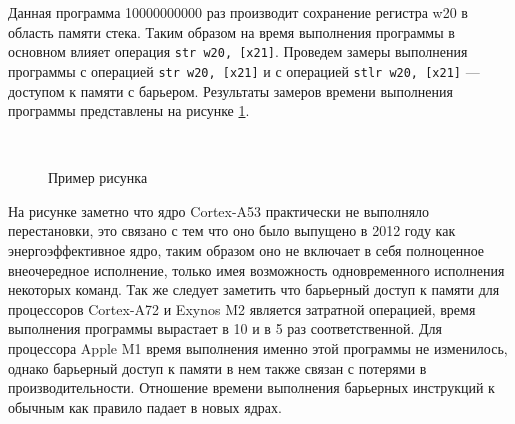 
Данная программа 10000000000 раз производит сохранение регистра w20 в область памяти стека. Таким образом на время выполнения программы в основном влияет операция \texttt{str     w20, [x21]}. Проведем замеры выполнения программы с операцией \texttt{str     w20, [x21]} и с операцией \texttt{stlr     w20, [x21]} --- доступом к памяти с барьером. Результаты замеров времени выполнения программы представлены на рисунке \ref{fig:speed}.
	
\begin{figure}[hbtp]
		\centering
	\\
	\caption{Пример рисунка}
	\label{fig:speed}
\end{figure}

На рисунке заметно что ядро Cortex-A53 практически не выполняло перестановки, это связано с тем что оно было выпущено в 2012 году как энергоэффективное ядро, таким образом оно не включает в себя полноценное внеочередное исполнение, только имея возможность одновременного исполнения некоторых команд. Так же следует заметить что барьерный доступ к памяти для процессоров Cortex-A72 и Exynos M2 является затратной операцией, время выполнения программы вырастает в 10 и в 5 раз соответственной. Для процессора Apple M1 время выполнения именно этой программы не изменилось, однако барьерный доступ к памяти в нем также связан с потерями в производительности. Отношение времени выполнения барьерных инструкций к обычным как правило падает в новых ядрах.

